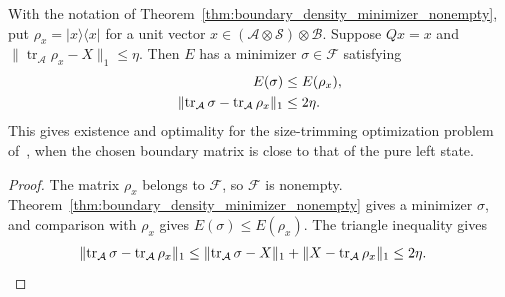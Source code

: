 \begin{theorem}
    \label{thm:boundary_density_minimizer}
    \leanok
    With the notation of Theorem~\ref{thm:boundary_density_minimizer_nonempty},
    put $\rho_x=\lvert x\rangle\langle x\rvert$ for a unit vector
    $x\in(\mathcal A\otimes\mathcal S)\otimes\mathcal B$. Suppose
    $Qx=x$ and $\lVert\operatorname{tr}_{\mathcal A}\rho_x-X\rVert_1\le\eta$.
    Then $E$ has a minimizer $\sigma\in\mathcal F$ satisfying
    \begin{align}
        E(\sigma)                                     & \le E(\rho_x), \notag \\
        \lVert\operatorname{tr}_{\mathcal A}\sigma
        -\operatorname{tr}_{\mathcal A}\rho_x\rVert_1 & \le2\eta. \notag
    \end{align}
    This gives existence and optimality for the size-trimming optimization
    problem of~\cite[lines 472--476]{Landau2013PolynomialTime}, when the
    chosen boundary matrix is close to that of the pure left state.
\end{theorem}
\begin{proof}\leanok
    The matrix $\rho_x$ belongs to $\mathcal F$, so $\mathcal F$ is nonempty.
    Theorem~\ref{thm:boundary_density_minimizer_nonempty} gives a minimizer
    $\sigma$, and comparison with $\rho_x$ gives
    $E(\sigma)\le E(\rho_x)$. The triangle inequality gives
    \begin{align}
        \lVert\operatorname{tr}_{\mathcal A}\sigma
        -\operatorname{tr}_{\mathcal A}\rho_x\rVert_1
         & \le\lVert\operatorname{tr}_{\mathcal A}\sigma-X\rVert_1
        +\lVert X-\operatorname{tr}_{\mathcal A}\rho_x\rVert_1
        \le2\eta. \notag
    \end{align}
\end{proof}
